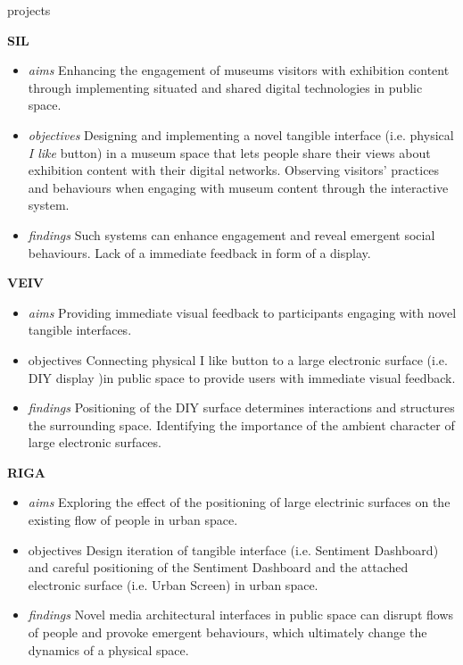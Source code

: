 \begin{singlespace}{

\begin{labeling}{projects}

\item [\textbf{SIL}] 
\begin {itemize} 
\footnotesize
\item [\textit{aims}] Enhancing the engagement of museums visitors with exhibition content through implementing situated and shared digital technologies in public space. 
\item [\textit{objectives}] Designing and implementing a novel tangible interface (i.e. physical \textit{I like} button) in a museum space that lets people share their views about exhibition content with their digital networks. \newline Observing visitors' practices and behaviours when engaging with museum content through the interactive system. 
\item [\textit{findings}] Such systems can enhance engagement and reveal emergent social behaviours. \newline Lack of a immediate feedback in form of a display.

\end{itemize}

\item [\textbf{VEIV}] 
\begin {itemize}
\footnotesize
\item [\textit{aims}] Providing immediate visual feedback to participants engaging with novel tangible interfaces.
\item [{objectives}] Connecting physical {I like} button to a large electronic surface (i.e. {DIY display} )in public space to provide users with immediate visual feedback.
\item [\textit{findings}]  Positioning of the DIY surface determines interactions and structures the surrounding space. \newline Identifying the importance of the ambient character of large electronic surfaces.
\end{itemize}

\item [\textbf{RIGA}] 
\begin {itemize}
\footnotesize
\item [\textit{aims}] Exploring the effect of the positioning of large electrinic surfaces on the existing flow of people in urban space.
\item [{objectives}] Design iteration of tangible interface (i.e. {Sentiment Dashboard}) and careful positioning of the {Sentiment Dashboard} and the attached electronic surface (i.e. {Urban Screen}) in urban space.
\item [\textit{findings}] Novel media architectural interfaces in public space can disrupt flows of people and provoke emergent behaviours, which ultimately change the dynamics of a physical space.
\end{itemize}


\end{labeling}}
\end{singlespace}
